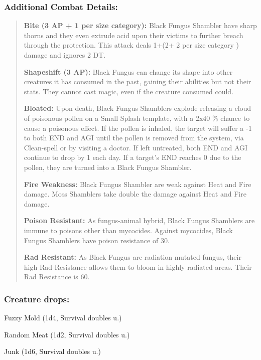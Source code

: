 \documentclass[11pt,a4paper,twocolumn]{book}
\begin{document}
	\subsubsection*{Additional Combat Details:}
	\begin{verse}
		\textbf{Bite (3 AP + 1 per size category):} Black Fungus Shambler have sharp thorns and they even extrude acid upon their victims to further breach through the protection. This attack deals 1+(2+ 2 per size category ) damage and ignores 2 DT.
		
		\textbf{Shapeshift (3 AP):} Black Fungus can change its shape into other creatures it has consumed in the past, gaining their abilities but not their stats. They cannot cast magic, even if the creature consumed could.
		
		\textbf{Bloated:} Upon death, Black Fungus Shamblers explode releasing a cloud of poisonous pollen on a Small Splash template, with a 2x40 \%  chance to cause a poisonous effect. If the pollen is inhaled, the target will suffer a -1 to both END and AGI until the pollen is removed from the system, via Clean-spell or by visiting a doctor. If left untreated, both END and AGI continue to drop by 1 each day. If a target's END reaches 0 due to the pollen, they are turned into a Black Fungus Shambler.
		
		\textbf{Fire Weakness:} Black Fungus Shambler are weak against Heat and Fire damage. Moss Shamblers take double the damage against Heat and Fire damage.
		
		\textbf{Poison Resistant:} As fungus-animal hybrid, Black Fungus Shamblers are immune to poisons other than mycocides. Against mycocides, Black Fungus Shamblers have poison resistance of 30.
		
		\textbf{Rad Resistant:} As Black Fungus are radiation mutated fungus, their high Rad Resistance allows them to bloom in highly radiated areas. Their Rad Resistance is 60.
	\end{verse}
	
	\subsubsection*{Creature drops:}
	\begin{compactitem}
		\item Fuzzy Mold (1d4, Survival doubles u.)
		\item Random Meat (1d2, Survival doubles u.)
		\item Junk (1d6, Survival doubles u.)
	\end{compactitem}
	
\end{document}

